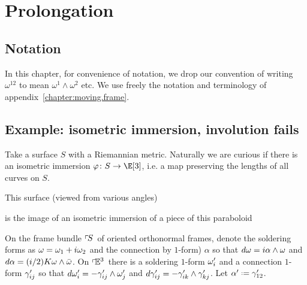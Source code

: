 \chapter{Prolongation}\label{chapter:prolongation}
%
\section{Notation}In this chapter, for convenience of notation, we drop our convention of writing \(\omega^{12}\) to mean \(\omega^1\wedge\omega^2\) etc.
We use freely the notation and terminology of appendix~\ref{chapter:moving.frame}. 
\section{Example: isometric immersion, involution fails}
Take a surface \(S\) with a Riemannian metric.
Naturally we are curious if there is an isometric immersion \(\varphi \colon S \to \E[3]\), i.e. a map preserving the lengths of all curves on \(S\).
\begin{example}This surface (viewed from various angles)
\begin{center}
\end{center}
is the image of an isometric immersion of a piece of this paraboloid
\begin{center}
\end{center}
\end{example}
On the frame bundle \(\left\ulcorner\!S\right.\) of oriented orthonormal frames, denote the soldering forms as \(\omega=\omega_1+i\omega_2\) and the connection by \(1\)-form) \(\alpha\) so that \(d\omega=i\alpha \wedge \omega\) and \(d\alpha=(i/2)K\omega \wedge \bar{\omega}\).
On \(\left\ulcorner\!\mathbb{E}^{3}\right.\) there is a soldering \(1\)-form \(\omega'_i\) and a connection \(1\)-form \(\gamma'_{ij}\) so that \(d\omega'_i = -\gamma'_{ij} \wedge \omega'_j\) and \(d\gamma'_{ij} = -\gamma'_{ik} \wedge \gamma'_{kj}\).
Let \(\otalpha\defeq\qc_{12}\).

